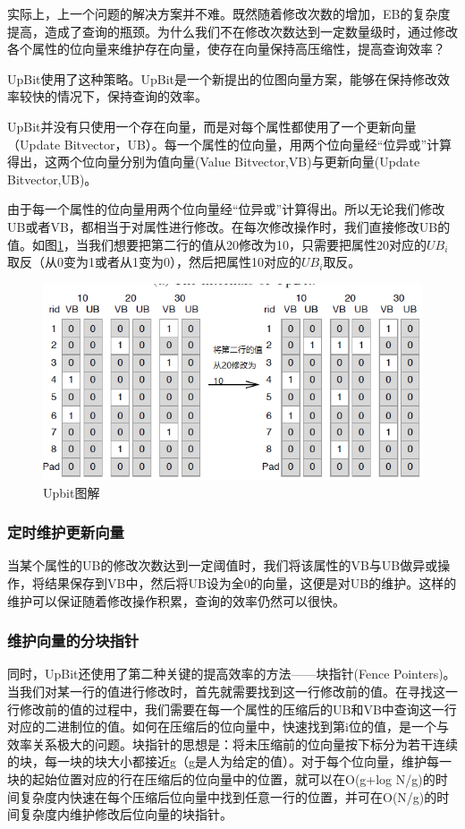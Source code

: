 \documentclass[11pt, a4paper]{article}
\begin{document}
  实际上，上一个问题的解决方案并不难。既然随着修改次数的增加，EB的复杂度提高，造成了查询的瓶颈。为什么我们不在修改次数达到一定数量级时，通过修改各个属性的位向量来维护存在向量，使存在向量保持高压缩性，提高查询效率？

  UpBit使用了这种策略。UpBit是一个新提出的位图向量方案，能够在保持修改效率较快的情况下，保持查询的效率。

  UpBit并没有只使用一个存在向量，而是对每个属性都使用了一个更新向量（Update Bitvector，UB）。每一个属性的位向量，用两个位向量经“位异或”计算得出，这两个位向量分别为值向量(Value Bitvector,VB)与更新向量(Update Bitvector,UB)。

  由于每一个属性的位向量用两个位向量经“位异或”计算得出。所以无论我们修改UB或者VB，都相当于对属性进行修改。在每次修改操作时，我们直接修改UB的值。如图\ref{fig:upbit}，当我们想要把第二行的值从20修改为10，只需要把属性20对应的$UB_i$取反（从0变为1或者从1变为0），然后把属性10对应的$UB_i$取反。

  \begin{figure}[H]
    \begin{center}
      \includegraphics[width=5in]{upbit.png}
      \caption{Upbit图解}
      \label{fig:upbit}
    \end{center}
  \end{figure}


  \subsubsection{定时维护更新向量}
  当某个属性的UB的修改次数达到一定阈值时，我们将该属性的VB与UB做异或操作，将结果保存到VB中，然后将UB设为全0的向量，这便是对UB的维护。这样的维护可以保证随着修改操作积累，查询的效率仍然可以很快。

  \subsubsection{维护向量的分块指针}
  同时，UpBit还使用了第二种关键的提高效率的方法——块指针(Fence Pointers)。当我们对某一行的值进行修改时，首先就需要找到这一行修改前的值。在寻找这一行修改前的值的过程中，我们需要在每一个属性的压缩后的UB和VB中查询这一行对应的二进制位的值。如何在压缩后的位向量中，快速找到第i位的值，是一个与效率关系极大的问题。块指针的思想是：将未压缩前的位向量按下标分为若干连续的块，每一块的块大小都接近g（g是人为给定的值）。对于每个位向量，维护每一块的起始位置对应的行在压缩后的位向量中的位置，就可以在O(g+log N/g)的时间复杂度内快速在每个压缩后位向量中找到任意一行的位置，并可在O(N/g)的时间复杂度内维护修改后位向量的块指针。
\end{document}
